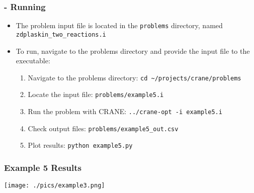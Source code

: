\begin{frame}[fragile]
	\frametitle{\insertsubsectionhead \hspace{1pt} - Running}
		\begin{itemize}
			\item The problem input file is located in the \texttt{problems} directory, named \texttt{zdplaskin\_two\_reactions.i}
			\item To run, navigate to the problems directory and provide the input file to the executable:
			\begin{enumerate}
				\item Navigate to the problems directory: \newline
				\hspace*{8pt} \texttt{cd \textasciitilde/projects/crane/problems}
				\item Locate the input file: \newline
				\hspace*{8pt} \texttt{problems/example5.i}
				\item Run the problem with CRANE: \newline
				\hspace*{8pt} \texttt{../crane-opt -i example5.i}
				\item Check output files: \newline
				\hspace*{8pt} \texttt{problems/example5\_out.csv}
				\item Plot results: \newline
				\hspace*{8pt} \texttt{python example5.py}
			\end{enumerate}
		\end{itemize}
\end{frame}

\begin{frame}
	\frametitle{Example 5 Results}
	\centering
	\texttt{[image: ./pics/example3.png]}
\end{frame}
